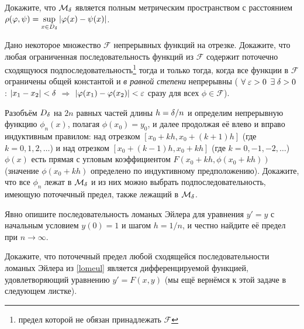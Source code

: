 \documentclass[a4paper, 12pt]{article}
\newcommand{\cF}{\ensuremath{\mathcal F}}
\newcommand{\cM}{\ensuremath{\mathcal M}}
\begin{document}
  Докажите, что $\cM_\de$ является полным метрическим пространством
  с расстоянием
  $\rho(\varphi,\psi)=\sup\limits_{x\in D_\delta}|\varphi(x)-\psi(x)|$.





  Дано некоторое множество $\cF$ непрерывных функций на отрезке.
  Докажите, что любая ограниченная последовательность функций из $\cF$
  содержит поточечно сходящуюся подпоследовательность\footnote
{предел которой не обязан принадлежать $\cF$}
  тогда и только тогда, когда все функции в $\cF$ ограничены общей
  константой и {\it в равной степени\/} непрерывны (
  $\forall\;\varepsilon>0$ $\exists\;\delta>0$ : $|x_1-x_2|<\delta$ $\Rightarrow$
  $|\varphi(x_1)-\varphi(x_2)|<\varepsilon$ сразу для всех $\phi\in\cF$\;).





\label{lomeul}
  Разобъём $D_\delta$ на $2n$ равных частей длины $h=\delta/n$ и определим
  непрерывную функцию $\phi_n(x)$, полагая $\phi(x_0)=y_0$, и далее
  продолжая её влево и вправо индуктивным правилом: над отрезком
  $[x_0+kh,x_0+(k+1)h]$ (где $k=0,1,2,\dots$) и над отрезком
  $[x_0+(k-1)h,x_0+kh]$ (где $k=0,-1,-2,\dots$) $\phi(x)$ есть прямая с
  угловым коэффициентом $F(x_0+kh,\phi(x_0+kh))$ (значение $\phi(x_0+kh)$
  определено по индуктивному предположению). Докажите, что все $\phi_n$
  лежат в $\cM_\de$ и из них можно выбрать подпоследовательность,
  имеющую поточечный предел, также лежащий в $\cM_\de$.





  Явно опишите последовательность ломаных Эйлера для уравнения $y'=y$ с
  начальным условием $y(0)=1$ и шагом $h=1/n$, и честно найдите её
  предел при $n\to\infty$.





  Докажите, что поточечный предел любой сходящейся последовательности
  ломаных Эйлера из \ref{lomeul} является дифференцируемой функцией,
  удовлетворяющий уравнению $y'=F(x,y)$ (мы ещё вернёмся к этой задаче
  в следующем листке).






\end{document}
